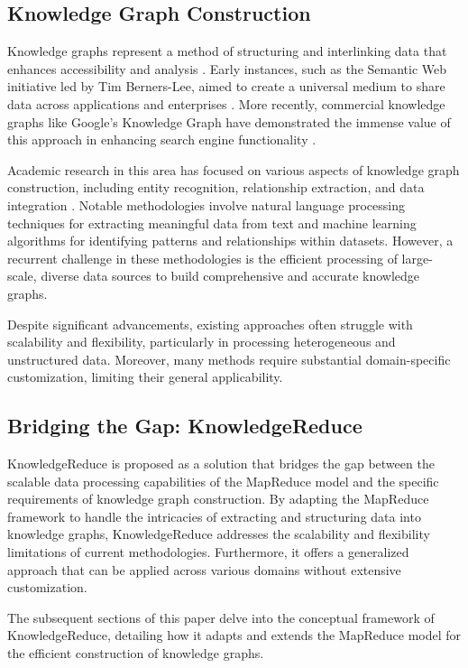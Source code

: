 \documentclass{article}
\begin{document}
\subsection{Knowledge Graph Construction}
Knowledge graphs represent a method of structuring and interlinking data that enhances accessibility and analysis \cite{fensel2020introduction}. Early instances, such as the Semantic Web initiative led by Tim Berners-Lee, aimed to create a universal medium to share data across applications and enterprises \cite{berners2001semantic}. More recently, commercial knowledge graphs like Google's Knowledge Graph have demonstrated the immense value of this approach in enhancing search engine functionality \cite{paulheim2017knowledge}.

Academic research in this area has focused on various aspects of knowledge graph construction, including entity recognition, relationship extraction, and data integration \cite{noy2019industry}. Notable methodologies involve natural language processing techniques for extracting meaningful data from text and machine learning algorithms for identifying patterns and relationships within datasets. However, a recurrent challenge in these methodologies is the efficient processing of large-scale, diverse data sources to build comprehensive and accurate knowledge graphs.

Despite significant advancements, existing approaches often struggle with scalability and flexibility, particularly in processing heterogeneous and unstructured data. Moreover, many methods require substantial domain-specific customization, limiting their general applicability.

\subsection{Bridging the Gap: KnowledgeReduce}
KnowledgeReduce is proposed as a solution that bridges the gap between the scalable data processing capabilities of the MapReduce model and the specific requirements of knowledge graph construction. By adapting the MapReduce framework to handle the intricacies of extracting and structuring data into knowledge graphs, KnowledgeReduce addresses the scalability and flexibility limitations of current methodologies. Furthermore, it offers a generalized approach that can be applied across various domains without extensive customization.

The subsequent sections of this paper delve into the conceptual framework of KnowledgeReduce, detailing how it adapts and extends the MapReduce model for the efficient construction of knowledge graphs.
\end{document}
